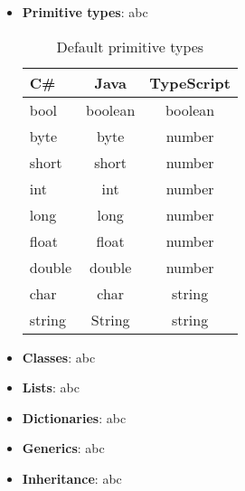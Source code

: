     
\begin{itemize}
  \item \textbf{Primitive types}: abc
\begin{table}[ht]
\centering
\caption{Default primitive types}
\begin{tabular}[t]{lcc}
\hline
C\#     & Java     & TypeScript \\
\hline
bool    & boolean  & boolean    \\
byte    & byte     & number     \\
short   & short    & number     \\
int     & int      & number     \\
long    & long     & number     \\
float   & float    & number     \\
double  & double   & number     \\
char    & char     & string     \\
string  & String   & string     \\
\hline
\end{tabular}
\end{table}%
  
  \item \textbf{Classes}: abc
  \item \textbf{Lists}: abc
  \item \textbf{Dictionaries}: abc
  \item \textbf{Generics}: abc
  \item \textbf{Inheritance}: abc

\end{itemize}